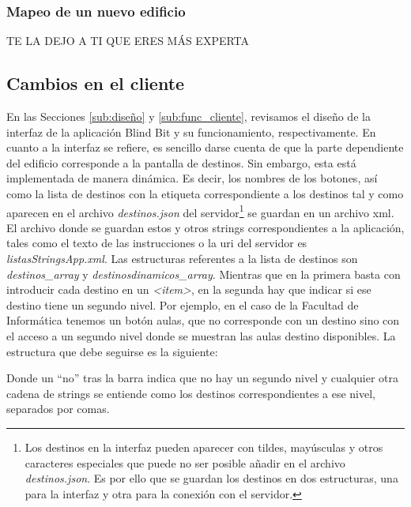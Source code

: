 \subsubsection{Mapeo de un nuevo edificio}

TE LA DEJO A TI QUE ERES MÁS EXPERTA



\subsection{Cambios en el cliente}

En las Secciones \ref{sub:diseño} y \ref{sub:func_cliente}, revisamos el diseño de la interfaz de la aplicación Blind Bit y su funcionamiento, respectivamente. En cuanto a la interfaz se refiere, es sencillo darse cuenta de que la parte dependiente del edificio corresponde a la pantalla de destinos. Sin embargo, esta está implementada de manera dinámica. Es decir, los nombres de los botones, así como la lista de destinos con la etiqueta correspondiente a los destinos tal y como aparecen en el archivo \textit{destinos.json} del servidor\footnote{Los destinos en la interfaz pueden aparecer con tildes, mayúsculas y otros caracteres especiales que puede no ser posible añadir en el archivo \textit{destinos.json}. Es por ello que se guardan los destinos en dos estructuras, una para la interfaz y otra para la conexión con el servidor.} se guardan en un archivo xml. El archivo donde se guardan estos y otros strings correspondientes a la aplicación, tales como el texto de las instrucciones o la uri del servidor es \textit{listasStringsApp.xml}. Las estructuras referentes a la lista de destinos son \textit{destinos\_array} y \textit{destinosdinamicos\_array}. Mientras que en la primera basta con introducir cada destino en un \textit{<item>}, en la segunda hay que indicar si ese destino tiene un segundo nivel. Por ejemplo, en el caso de la Facultad de Informática tenemos un botón aulas, que no corresponde con un destino sino con el acceso a un segundo nivel donde se muestran las aulas destino disponibles. La estructura que debe seguirse es la siguiente: 


 



Donde un ``no'' tras la barra indica que no hay un segundo nivel y cualquier otra cadena de strings se entiende como los destinos correspondientes a ese nivel, separados por comas.

